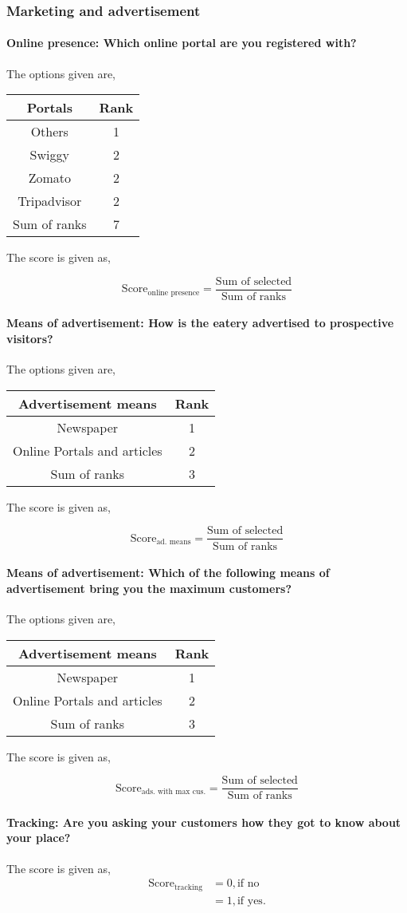 \documentclass[oneside,twocolumn]{article}
\newcommand{\tsub}[2]{\text{#1}_{\text{#2}}}
\newcommand{\dsub}[2]{\dfrac{\text{#1}}{\text{#2}}}
\newcommand{\multsel}[1]
{
	\[
		\tsub{Score}{#1} = \dsub{Sum of selected}{Sum of ranks}
	\]
}
\newenvironment{ttable}
{
\begin{center}
\begin{tabular}{c|c}
\hline
}
{
\\ \hline
\end{tabular}
\end{center}
}
\begin{document}
\subsubsection{Marketing and advertisement}
\paragraph{Online presence: Which online portal are you registered with?}
The options given are,
\begin{ttable}
	Portals & Rank \\ \hline
	Others & 1 \\
	Swiggy & 2 \\
	Zomato & 2 \\
	Tripadvisor & 2 \\ \hline
	Sum of ranks & 7
\end{ttable}
The score is given as,
\multsel{online presence}
\paragraph{Means of advertisement: How is the eatery advertised to prospective visitors?}
The options given are,
\begin{ttable}
	Advertisement means & Rank \\ \hline
	Newspaper & 1 \\
	Online Portals and articles & 2 \\ \hline
	Sum of ranks & 3
\end{ttable}
The score is given as,
\multsel{ad. means}
\paragraph{Means of advertisement: Which of the following means of advertisement bring you the maximum customers?}
The options given are,
\begin{ttable}
	Advertisement means & Rank \\ \hline
	Newspaper & 1 \\
	Online Portals and articles & 2 \\ \hline
	Sum of ranks & 3
\end{ttable}
The score is given as,
\multsel{ads. with max cus.}
\paragraph{Tracking: Are you asking your customers how they got to know about your place?}
The score is given as,
\begin{align*}
	\tsub{Score}{tracking} &= 0, \text{if no} \\
	&= 1, \text{if yes}.
\end{align*}
\end{document}
